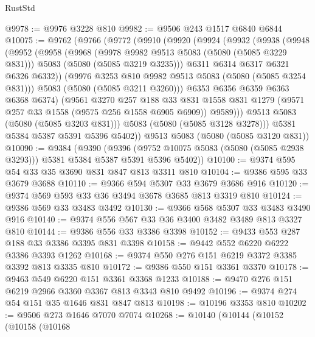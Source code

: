 \begin{lexlean}{RustStd}
\begin{coremodule}
{\begin{coremodule}
{{{{{@9978 := @9976 @3228 @810
@9982 := @9506 @243 @1517 @6840 @6844
@10075 := @9762
    (@9766
      (@9772
        (@9910
          (@9920
            (@9924
              (@9932
                (@9938
                  (@9948
                    (@9952
                      (@9958
                        (@9968
                          (@9978 @9982 @9513 @5083 (@5080 (@5085 @3229 @831)))
                          @5083
                          (@5080 (@5085 @3219 @3235)))
                        @6311
                        @6314
                        @6317
                        @6321
                        @6326
                        @6332))
                    (@9976 @3253 @810 @9982 @9513 @5083 (@5080 (@5085 @3254 @831)))
                    @5083
                    (@5080 (@5085 @3211 @3260)))
                  @6353
                  @6356
                  @6359
                  @6363
                  @6368
                  @6374)
                (@9561
                  @3270
                  @257
                  @188
                  @33
                  @831
                  @1558
                  @831
                  @1279
                  (@9571 @257 @33 @1558 (@9575 @256 @1558 @6905 @6909))
                  @9589)))
            @9513
            @5083
            (@5080 (@5085 @3203 @831)))
          @5083
          (@5080 (@5085 @3128 @3278)))
        @5381
        @5384
        @5387
        @5391
        @5396
        @5402))
    @9513
    @5083
    (@5080 (@5085 @3120 @831))
@10090 := @9384
    (@9390
      (@9396 (@9752 @10075 @5083 (@5080 (@5085 @2938 @3293))) @5381 @5384 @5387 @5391 @5396 @5402))
@10100 := @9374 @595 @54 @33 @35 @3690 @831 @847 @813 @3311 @810
@10104 := @9386 @595 @33 @3679 @3688
@10110 := @9366 @594 @5307 @33 @3679 @3686 @916
@10120 := @9374 @569 @593 @33 @36 @3494 @3678 @3685 @813 @3319 @810
@10124 := @9386 @569 @33 @3483 @3492
@10130 := @9366 @568 @5307 @33 @3483 @3490 @916
@10140 := @9374 @556 @567 @33 @36 @3400 @3482 @3489 @813 @3327 @810
@10144 := @9386 @556 @33 @3386 @3398
@10152 := @9433 @553 @287 @188 @33 @3386 @3395 @831 @3398
@10158 := @9442 @552 @6220 @6222 @3386 @3393 @1262
@10168 := @9374 @550 @276 @151 @6219 @3372 @3385 @3392 @813 @3335 @810
@10172 := @9386 @550 @151 @3361 @3370
@10178 := @9463 @549 @6220 @151 @3361 @3368 @1233
@10188 := @9470 @276 @151 @6219 @2966 @3360 @3367 @813 @3343 @810 @9492
@10196 := @9374 @274 @54 @151 @35 @1646 @831 @847 @813
@10198 := @10196 @3353 @810
@10202 := @9506 @273 @1646 @7070 @7074
@10268 := @10140
    (@10144
      (@10152
        (@10158
          (@10168
}}}}}
\end{coremodule}}
\end{coremodule}
\end{lexlean}
